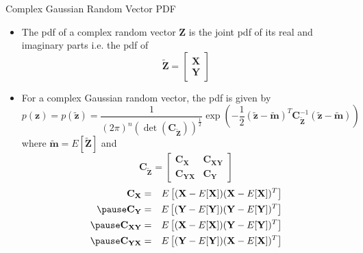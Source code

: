\documentclass[t]{beamer}
\begin{document}
\begin{frame}{Complex Gaussian Random Vector PDF}
  \footnotesize
  \begin{itemize}
    \item \pause The pdf of a complex random vector $\mathbf{Z}$ is the joint pdf of its real and imaginary parts i.e. the pdf of
      \begin{equation*}
        \tilde{\mathbf{Z}} = \begin{bmatrix} \mathbf{X} \\ \mathbf{Y} \end{bmatrix}
      \end{equation*}
    \item \pause For a complex Gaussian random vector, the pdf is given by
      \begin{equation*}
      p(\mathbf{z}) = p(\tilde{\mathbf{z}}) = \frac{1}{(2\pi)^n(\det(\mathbf{C}_{\tilde{\mathbf{Z}}}))^{\frac{1}{2}}} \exp\left(-\frac{1}{2} (\tilde{\mathbf{z}}-\tilde{\mathbf{m}})^T\mathbf{C}_{\tilde{\mathbf{Z}}}^{-1}(\tilde{\mathbf{z}}-\tilde{\mathbf{m}})\right)
      \end{equation*}
     \pause where $\tilde{\mathbf{m}} = E[\tilde{\mathbf{Z}}]$ \pause and
      \begin{equation*}
        \mathbf{C}_{\tilde{\mathbf{Z}}} = \begin{bmatrix} \mathbf{C}_\mathbf{X} & \mathbf{C}_{\mathbf{XY}} \\ \mathbf{C}_{\mathbf{YX}} & \mathbf{C}_\mathbf{Y} \end{bmatrix}
      \end{equation*}
      \pause
      \begin{eqnarray*}
        \mathbf{C_X} & = & E \left[ (\mathbf{X} - E[\mathbf{X}])(\mathbf{X} - E[\mathbf{X}])^T \right] \\ \pause
        \mathbf{C_Y} & = & E \left[ (\mathbf{Y} - E[\mathbf{Y}])(\mathbf{Y} - E[\mathbf{Y}])^T \right] \\ \pause
        \mathbf{C_{XY}} & = & E \left[ (\mathbf{X} - E[\mathbf{X}])(\mathbf{Y} - E[\mathbf{Y}])^T \right] \\ \pause
        \mathbf{C_{YX}} & = & E \left[ (\mathbf{Y} - E[\mathbf{Y}])(\mathbf{X} - E[\mathbf{X}])^T \right] 
      \end{eqnarray*}
  \end{itemize}
  \normalsize
\end{frame}
\end{document}
